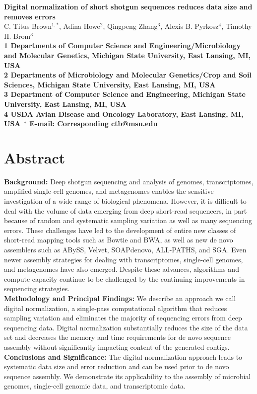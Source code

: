 \documentclass[10pt]{article}
\date{}
\begin{document}
\begin{flushleft}
{\Large
\textbf{Digital normalization of short shotgun sequences reduces data size
and removes errors}
}
\\
C. Titus Brown$^{1,\ast}$, 
Adina Howe$^{2}$,
Qingpeng Zhang$^{3}$,
Alexis B. Pyrkosz$^{4}$,
Timothy H. Brom$^{3}$
\\
\bf{1} Departments of Computer Science and Engineering/Microbiology and Molecular Genetics, Michigan State University, East Lansing, MI, USA
\\
\bf{2} Departments of Microbiology and Molecular Genetics/Crop and Soil Sciences, Michigan State University, East Lansing, MI, USA
\\
\bf{3} Department of Computer Science and Engineering, Michigan State University, East Lansing, MI, USA
\\
{\bf{4} USDA Avian Disease and Oncology Laboratory, East Lansing, MI, USA}
$\ast$ E-mail: Corresponding ctb@msu.edu
\end{flushleft}

\section*{Abstract}

{\bf Background:} Deep shotgun sequencing and analysis of genomes,
transcriptomes, amplified single-cell genomes, and metagenomes enables
the sensitive investigation of a wide range of biological
phenomena. However, it is difficult to deal with the volume of data
emerging from deep short-read sequencers, in part because of random
and systematic sampling variation as well as many sequencing errors.
These challenges have led to the development of entire new classes of
short-read mapping tools such as Bowtie and BWA, as well as new de
novo assemblers such as ABySS, Velvet, SOAPdenovo, ALL-PATHS, and SGA.
Even newer assembly strategies for dealing with transcriptomes,
single-cell genomes, and metagenomes have also emerged.  Despite these
advances, algorithms and compute capacity continue to be challenged by
the continuing improvements in sequencing strategies.
\\
{\bf Methodology and Principal Findings:} We describe an approach we call
digital normalization, a single-pass computational algorithm that
reduces sampling variation and eliminates the majority of sequencing
errors from deep sequencing data. Digital normalization substantially
reduces the size of the data set and decreases the memory and time
requirements for de novo sequence assembly without significantly
impacting content of the generated contigs.
\\
{\bf Conclusions and Significance:} The digital normalization approach leads
to systematic data size and error reduction and can be used prior to
de novo sequence assembly. We demonstrate its applicability to the
assembly of microbial genomes, single-cell genomic data, and
transcriptomic data.
\end{document}
